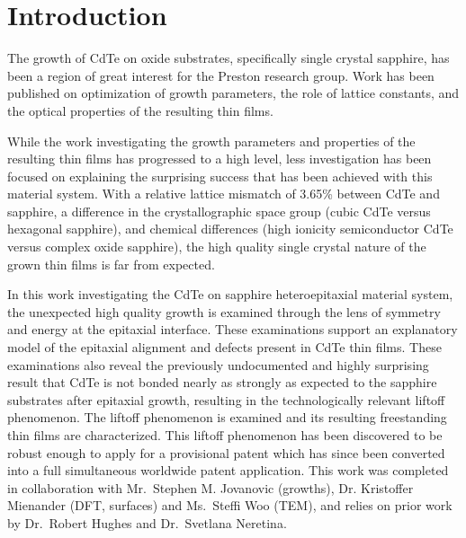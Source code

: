 \section{Introduction}
The growth of CdTe on oxide substrates, specifically single crystal sapphire, has been a region of great interest for the Preston research group.
Work has been published on optimization of growth parameters, the role of lattice constants, and the optical properties of the resulting thin films\cite{Neretina2009a,Neretina2008b,Neretina2009b,Neretina2007,Neretina2006,cdte-optical}.

While the work investigating the growth parameters and properties of the resulting thin films has progressed to a high level, less investigation has been focused on explaining the surprising success that has been achieved with this material system.
With a relative lattice mismatch of 3.65\% between CdTe and sapphire, a difference in the 
crystallographic space group (cubic CdTe versus hexagonal sapphire), and chemical differences (high ionicity semiconductor CdTe versus complex oxide sapphire), the high quality single crystal nature of the grown thin films is far from expected.

In this work investigating the CdTe on sapphire heteroepitaxial material system, the unexpected high quality growth is examined through the lens of symmetry and energy at the epitaxial interface.
These examinations support an explanatory model of the epitaxial alignment and defects present in CdTe thin films.
These examinations also reveal the previously undocumented and highly surprising result that CdTe is not bonded nearly as strongly as expected to the sapphire substrates after epitaxial growth, resulting in the technologically relevant liftoff phenomenon.
The liftoff phenomenon is examined and its resulting freestanding thin films are characterized.
This liftoff phenomenon has been discovered to be robust enough to apply for a provisional patent\cite{patent} which has since been converted into a full simultaneous worldwide patent application.
This work was completed in collaboration with Mr.~Stephen M. Jovanovic (growths), Dr.
Kristoffer Mienander (DFT, surfaces) and Ms.~Steffi Woo (TEM), and relies on prior work by Dr.~Robert Hughes and Dr.~Svetlana Neretina.

